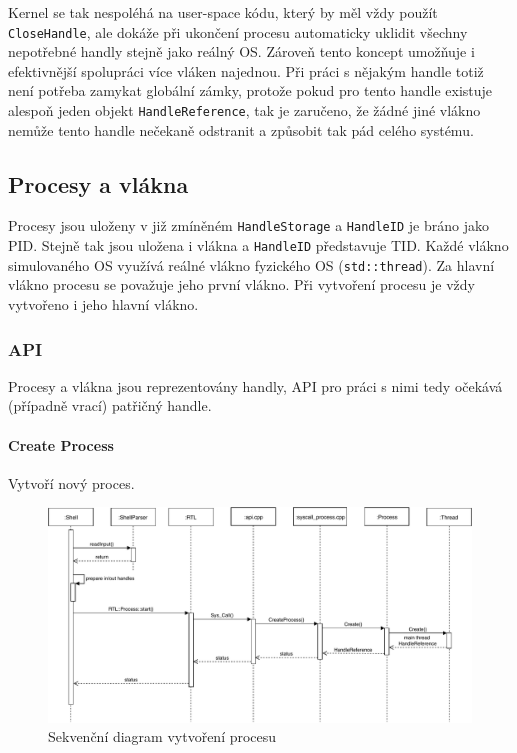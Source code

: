 \documentclass[11pt,a4paper]{scrartcl}
\begin{document}
	Kernel se tak nespoléhá na  user-space kódu, který by měl vždy použít \verb|CloseHandle|, ale dokáže při ukončení procesu automaticky uklidit všechny nepotřebné handly stejně jako reálný OS. Zároveň tento koncept umožňuje i efektivnější spolupráci více vláken najednou. Při práci s nějakým handle totiž není potřeba zamykat globální zámky, protože pokud pro tento handle existuje alespoň jeden objekt \verb|HandleReference|, tak je zaručeno, že žádné jiné vlákno nemůže tento handle nečekaně odstranit a způsobit tak pád celého systému.
	
	\subsection{Procesy a vlákna}
	
	Procesy jsou uloženy v již zmíněném \verb|HandleStorage| a \verb|HandleID| je bráno jako PID. Stejně tak jsou uložena i vlákna a \verb|HandleID| představuje TID. Každé vlákno simulovaného OS využívá reálné vlákno fyzického OS (\verb|std::thread|). Za hlavní vlákno procesu se považuje jeho první vlákno. Při vytvoření procesu je vždy vytvořeno i jeho hlavní vlákno.
	
	\subsubsection{API}
	Procesy a vlákna jsou reprezentovány handly, API pro práci s nimi tedy očekává (případně vrací) patřičný handle.
	
	\paragraph{Create Process}
	Vytvoří nový proces.
	
	\begin{figure}[H]
		\centering
		\includegraphics[width=14cm]{create-process-seq.pdf}
		\caption{Sekvenční diagram vytvoření procesu}
		\label{fig:create-process-seq}
	\end{figure}
	
\end{document}
